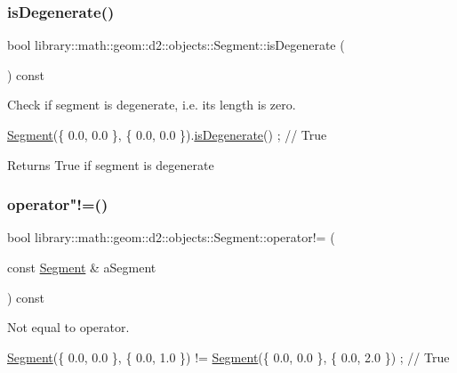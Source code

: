 \subsubsection{\texorpdfstring{is\+Degenerate()}{isDegenerate()}}
{\footnotesize\ttfamily bool library\+::math\+::geom\+::d2\+::objects\+::\+Segment\+::is\+Degenerate (\begin{DoxyParamCaption}{ }\end{DoxyParamCaption}) const}



Check if segment is degenerate, i.\+e. its length is zero. 


\begin{DoxyCode}
\hyperlink{classlibrary_1_1math_1_1geom_1_1d2_1_1objects_1_1_segment_a44ba44fd5f02a02fe34c40223b38fa8f}{Segment}(\{ 0.0, 0.0 \}, \{ 0.0, 0.0 \}).\hyperlink{classlibrary_1_1math_1_1geom_1_1d2_1_1objects_1_1_segment_a0ed58e12b0d91a83fdea0c13308a3d37}{isDegenerate}() ; \textcolor{comment}{// True}
\end{DoxyCode}


\begin{DoxyReturn}{Returns}
True if segment is degenerate 
\end{DoxyReturn}
\mbox{\label{classlibrary_1_1math_1_1geom_1_1d2_1_1objects_1_1_segment_ad7a06e9fc322b3baaf4c5ecf3a22d559}} 
\subsubsection{\texorpdfstring{operator"!=()}{operator!=()}}
{\footnotesize\ttfamily bool library\+::math\+::geom\+::d2\+::objects\+::\+Segment\+::operator!= (\begin{DoxyParamCaption}\item[{const \hyperlink{classlibrary_1_1math_1_1geom_1_1d2_1_1objects_1_1_segment}{Segment} \&}]{a\+Segment }\end{DoxyParamCaption}) const}



Not equal to operator. 


\begin{DoxyCode}
\hyperlink{classlibrary_1_1math_1_1geom_1_1d2_1_1objects_1_1_segment_a44ba44fd5f02a02fe34c40223b38fa8f}{Segment}(\{ 0.0, 0.0 \}, \{ 0.0, 1.0 \}) != \hyperlink{classlibrary_1_1math_1_1geom_1_1d2_1_1objects_1_1_segment_a44ba44fd5f02a02fe34c40223b38fa8f}{Segment}(\{ 0.0, 0.0 \}, \{ 0.0, 2.0 \}) ; \textcolor{comment}{// True}
\end{DoxyCode}



